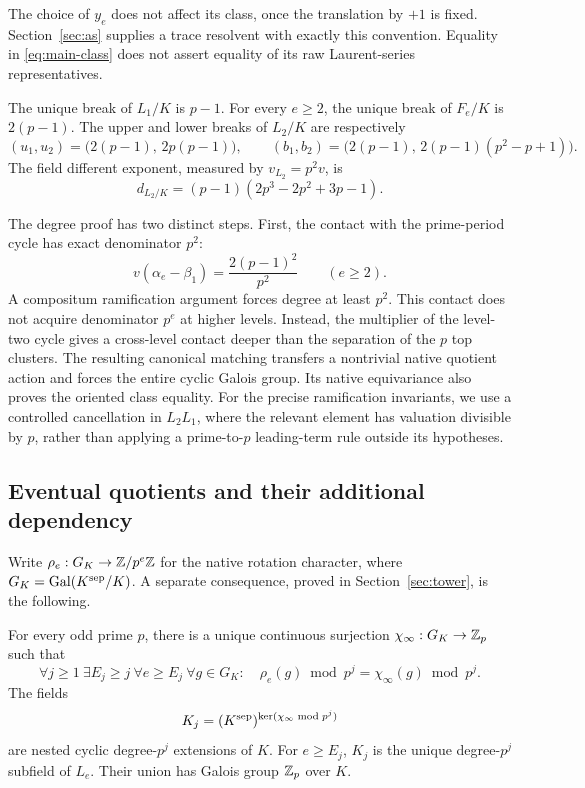 The choice of \(y_e\) does not affect its class, once the translation
by \(+1\) is fixed. Section~\ref{sec:as} supplies a trace resolvent
with exactly this convention. Equality in \eqref{eq:main-class}
does not assert equality of its raw Laurent-series representatives.

\begin{theorem}\label{thm:ramification}
The unique break of \(L_1/K\) is \(p-1\). For every \(e\ge2\), the
unique break of \(F_e/K\) is \(2(p-1)\).
The upper and lower breaks of \(L_2/K\) are respectively
\[
 (u_1,u_2)=\bigl(2(p-1),\,2p(p-1)\bigr),\qquad
 (b_1,b_2)=\bigl(2(p-1),\,2(p-1)(p^2-p+1)\bigr).
\]
The field different exponent, measured by \(v_{L_2}=p^2v\), is
\begin{equation}\label{eq:main-different}
 d_{L_2/K}=(p-1)(2p^3-2p^2+3p-1).
\end{equation}
\end{theorem}

The degree proof has two distinct steps. First, the contact with the
prime-period cycle has exact denominator \(p^2\):
\[
 v(\alpha_e-\beta_1)=\frac{2(p-1)^2}{p^2}
 \qquad(e\ge2).
\]
A compositum ramification argument forces degree at least \(p^2\).
This contact does not acquire denominator \(p^e\) at higher levels.
Instead, the multiplier of the level-two cycle gives a cross-level
contact deeper than the separation of the \(p\) top clusters.
The resulting canonical matching transfers a nontrivial native
quotient action and forces the entire cyclic Galois group.
Its native equivariance also proves the oriented class equality.
For the precise ramification invariants, we use a controlled
cancellation in \(L_2L_1\), where the relevant element has valuation
divisible by \(p\), rather than applying a prime-to-\(p\) leading-term
rule outside its hypotheses.

\subsection*{Eventual quotients and their additional dependency}

Write \(\rho_e:G_K\to\mathbb Z/p^e\mathbb Z\) for the native rotation character,
where \(G_K=\operatorname{Gal}(K^{\mathrm{sep}}/K)\). A separate consequence, proved in
Section~\ref{sec:tower}, is the following.

\begin{theorem}\label{thm:tower}
For every odd prime \(p\), there is a unique continuous surjection
\(\chi_\infty:G_K\to\mathbb Z_p\) such that
\begin{equation}\label{eq:eventual-intro}
 \forall j\ge1\ \exists E_j\ge j\ \forall e\ge E_j\ \forall g\in G_K:
 \quad \rho_e(g)\bmod p^j=\chi_\infty(g)\bmod p^j.
\end{equation}
The fields
\[
 K_j=(K^{\mathrm{sep}})^{\ker(\chi_\infty\bmod p^j)}
\]
are nested cyclic degree-\(p^j\) extensions of \(K\).
For \(e\ge E_j\), \(K_j\) is the unique degree-\(p^j\) subfield of
\(L_e\). Their union has Galois group \(\mathbb Z_p\) over \(K\).
\end{theorem}

